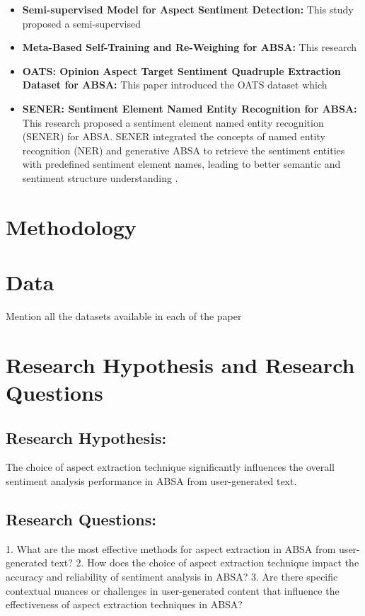 \documentclass{article}
\begin{document}
\begin{itemize}
    \item \textbf{Semi-supervised Model for Aspect Sentiment Detection: } This study proposed a semi-supervised \cite{Madhoushi2023SemiSupervisedMF}

    \item \textbf{Meta-Based Self-Training and Re-Weighing for ABSA: } This research \cite{He2023MetaBasedSA}

    \item \textbf{OATS: Opinion Aspect Target Sentiment Quadruple Extraction Dataset for ABSA: } This paper introduced the OATS dataset which \cite{chebolu2023oats}

    \item \textbf{SENER: Sentiment Element Named Entity Recognition for ABSA: } This research proposed a sentiment element named entity recognition (SENER) for ABSA. SENER integrated the concepts of named entity recognition (NER) and generative ABSA to retrieve the sentiment entities with predefined sentiment element names, leading to better semantic and sentiment structure understanding \cite{Lee2023SENERSE}.
\end{itemize}

\section{Methodology}

\section{Data}
Mention all the datasets available in each of the paper

\section{Research Hypothesis and Research Questions}
\subsection{Research Hypothesis:} 
The choice of aspect extraction technique significantly influences the overall sentiment analysis performance in ABSA from user-generated text.
\subsection{Research Questions: }

1. What are the most effective methods for aspect extraction in ABSA from user-generated text?
2. How does the choice of aspect extraction technique impact the accuracy and reliability of sentiment analysis in ABSA?
3. Are there specific contextual nuances or challenges in user-generated content that influence the effectiveness of aspect extraction techniques in ABSA?
\end{document}

